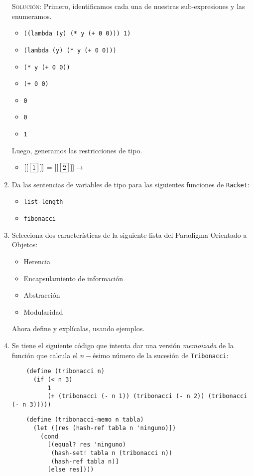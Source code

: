 \documentclass[letterpaper,11pt]{article}
\begin{document}
\begin{enumerate}
    \textsc{Solución:} Primero, identificamos cada una de nuestras 
    sub-expresiones y las enumeramos.
    \begin{itemize}
        \item {} \texttt{((lambda (y) (* y (+ 0 0))) 1)}
        \item {} \texttt{(lambda (y) (* y (+ 0 0)))}
        \item {} \texttt{(* y (+ 0 0))}
        \item {} \texttt{(+ 0 0)}
        \item {} \texttt{0}
        \item {} \texttt{0}
        \item {} \texttt{1}
    \end{itemize}

    Luego, generamos las restricciones de tipo.
    \begin{itemize}
        \item $[[\;\fbox{1}\;]]$ = $[[\;\fbox{2}\;]] \rightarrow$
    \end{itemize}

    \item Da las sentencias de variables de tipo para las siguientes funciones 
    de \texttt{Racket}:
    \begin{itemize}
        \item \texttt{list-length}
        \item \texttt{fibonacci}
    \end{itemize}

    \item Selecciona dos características de la siguiente lista del Paradigma 
    Orientado a Objetos:
    \begin{itemize}
        \item Herencia
        \item Encapsulamiento de información
        \item Abstracción
        \item Modularidad
    \end{itemize}

    Ahora define y explícalas, usando ejemplos.

    \item Se tiene el siguiente código que intenta dar una versión 
    \textit{memoizada} de la función que calcula el $n-$ésimo número de la 
    sucesión de \texttt{Tribonacci}:
    \begin{verbatim}
    (define (tribonacci n)
      (if (< n 3)
          1
          (+ (tribonacci (- n 1)) (tribonacci (- n 2)) (tribonacci (- n 3)))))
    \end{verbatim}
    \begin{verbatim}
    (define (tribonacci-memo n tabla)
      (let ([res (hash-ref tabla n 'ninguno)])
        (cond
          [(equal? res 'ninguno)
           (hash-set! tabla n (tribonacci n))
           (hash-ref tabla n)]
          [else res])))
    \end{verbatim}


\end{enumerate}
\end{document}
